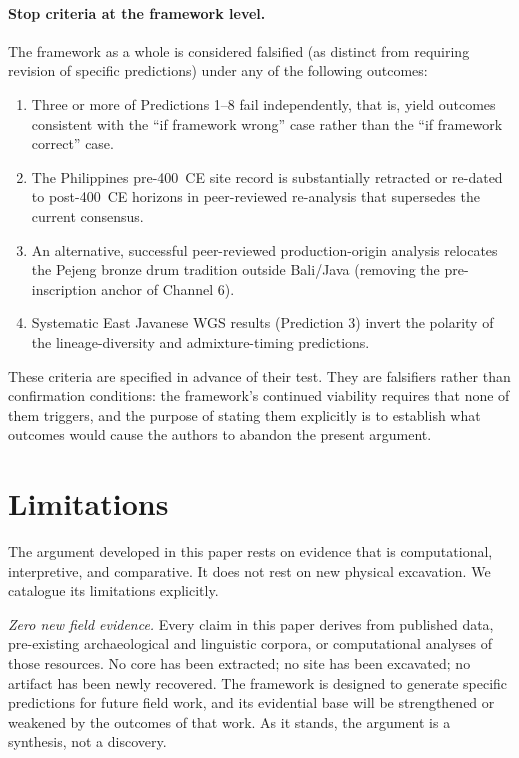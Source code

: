 \documentclass[12pt,a4paper]{article}
\begin{document}
\paragraph{Stop criteria at the framework level.}

The framework as a whole is considered falsified (as distinct from requiring revision of specific predictions) under any of the following outcomes:

\begin{enumerate}
\item Three or more of Predictions 1--8 fail independently, that is, yield outcomes consistent with the ``if framework wrong'' case rather than the ``if framework correct'' case.
\item The Philippines pre-400~CE site record is substantially retracted or re-dated to post-400~CE horizons in peer-reviewed re-analysis that supersedes the current consensus.
\item An alternative, successful peer-reviewed production-origin analysis relocates the Pejeng bronze drum tradition outside Bali/Java (removing the pre-inscription anchor of Channel 6).
\item Systematic East Javanese WGS results (Prediction 3) invert the polarity of the lineage-diversity and admixture-timing predictions.
\end{enumerate}

These criteria are specified in advance of their test. They are falsifiers rather than confirmation conditions: the framework's continued viability requires that none of them triggers, and the purpose of stating them explicitly is to establish what outcomes would cause the authors to abandon the present argument.


\section{Limitations}
\label{sec:limits}

The argument developed in this paper rests on evidence that is computational, interpretive, and comparative. It does not rest on new physical excavation. We catalogue its limitations explicitly.

\textit{Zero new field evidence.} Every claim in this paper derives from published data, pre-existing archaeological and linguistic corpora, or computational analyses of those resources. No core has been extracted; no site has been excavated; no artifact has been newly recovered. The framework is designed to generate specific predictions for future field work, and its evidential base will be strengthened or weakened by the outcomes of that work. As it stands, the argument is a synthesis, not a discovery.
\end{document}
